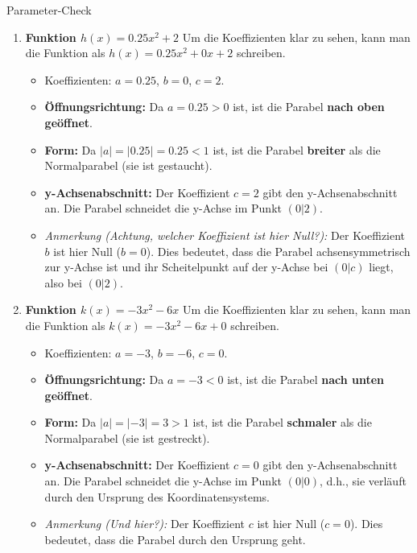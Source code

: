 \begin{loesungsumgebung}{Parameter-Check}
\begin{enumerate}[label=(\alph*)]
    \item \textbf{Funktion $h(x) = 0.25x^2 + 2$}
    Um die Koeffizienten klar zu sehen, kann man die Funktion als $h(x) = 0.25x^2 + 0x + 2$ schreiben.
    \begin{itemize}
        \item Koeffizienten: $a = 0.25$, $b = 0$, $c = 2$.
        \item \textbf{Öffnungsrichtung:} Da $a = 0.25 > 0$ ist, ist die Parabel \textbf{nach oben geöffnet}.
        \item \textbf{Form:} Da $|a| = |0.25| = 0.25 < 1$ ist, ist die Parabel \textbf{breiter} als die Normalparabel (sie ist gestaucht).
        \item \textbf{y-Achsenabschnitt:} Der Koeffizient $c = 2$ gibt den y-Achsenabschnitt an. Die Parabel schneidet die y-Achse im Punkt $(0|2)$.
        \item \textit{Anmerkung (Achtung, welcher Koeffizient ist hier Null?):} Der Koeffizient $b$ ist hier Null ($b=0$). Dies bedeutet, dass die Parabel achsensymmetrisch zur y-Achse ist und ihr Scheitelpunkt auf der y-Achse bei $(0|c)$ liegt, also bei $(0|2)$.
    \end{itemize}

    \item \textbf{Funktion $k(x) = -3x^2 - 6x$}
    Um die Koeffizienten klar zu sehen, kann man die Funktion als $k(x) = -3x^2 - 6x + 0$ schreiben.
    \begin{itemize}
        \item Koeffizienten: $a = -3$, $b = -6$, $c = 0$.
        \item \textbf{Öffnungsrichtung:} Da $a = -3 < 0$ ist, ist die Parabel \textbf{nach unten geöffnet}.
        \item \textbf{Form:} Da $|a| = |-3| = 3 > 1$ ist, ist die Parabel \textbf{schmaler} als die Normalparabel (sie ist gestreckt).
        \item \textbf{y-Achsenabschnitt:} Der Koeffizient $c = 0$ gibt den y-Achsenabschnitt an. Die Parabel schneidet die y-Achse im Punkt $(0|0)$, d.h., sie verläuft durch den Ursprung des Koordinatensystems.
        \item \textit{Anmerkung (Und hier?):} Der Koeffizient $c$ ist hier Null ($c=0$). Dies bedeutet, dass die Parabel durch den Ursprung geht.
    \end{itemize}
\end{enumerate}

\end{loesungsumgebung}


